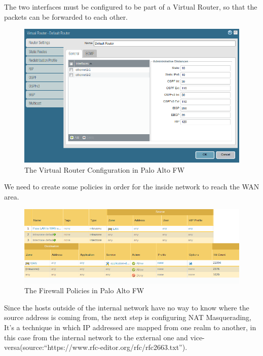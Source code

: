 The two interfaces must be configured to be part of a Virtual Router, so that the packets can be forwarded to each other.

\begin{figure}[!hb]
 \centering
 \includegraphics[width=13cm]{img/virtual_router.png}
 \caption{The Virtual Router Configuration in Palo Alto FW}
 \label{Virtual Router Configuration}
\end{figure}


We need to create some policies in order for the inside network to reach the WAN area.

\begin{figure}[!hb]
 \centering
 \includegraphics[width=13cm]{img/Firewall_Policy.png}
 \caption{The Firewall Policies in Palo Alto FW}
 \label{Firewall Policies}
\end{figure}


Since the hosts outside of the internal network have no way to know where the source address is coming from, the next step is configuring NAT Masquerading, It's a technique in which IP addressed are mapped from one realm to another, in this case from the internal network to the external one and vice-versa(source:``https://www.rfc-editor.org/rfc/rfc2663.txt'').

